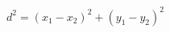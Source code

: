 \documentclass[preview]{standalone}
\begin{document}
\begin{align*}
d^2 = (x_1 - x_2)^2 + (y_1 - y_2)^2
\end{align*}
\end{document}
